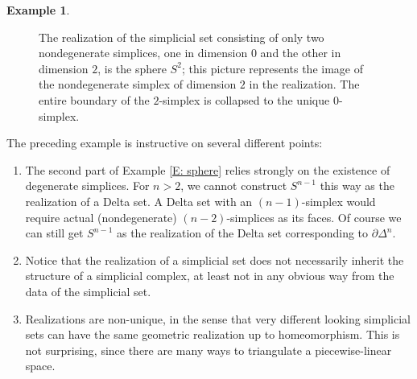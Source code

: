 \documentclass[12pt]{article}
\theoremstyle{plain}
\theoremstyle{definition}
\newtheorem{example}[theorem]{Example}
\newcommand{\bd}{\partial}
\begin{document}
\begin{example}
\begin{figure}[!htp]
\begin{center}
\end{center}
\caption{The realization of the simplicial set consisting of only two nondegenerate simplices, one in dimension $0$ and the other in dimension $2$, is the sphere $S^2$; this picture represents the image of the nondegenerate simplex of dimension $2$ in the realization. The entire boundary of the $2$-simplex is collapsed to the unique $0$-simplex. }\label{F: fig16}
\end{figure}


\end{example}

The preceding example is instructive on several different points:

\begin{enumerate}
\item The second part of Example \ref{E: sphere} relies strongly on the existence of degenerate simplices. For $n>2$, we cannot construct $S^{n-1}$ this way as the realization of a Delta set. A Delta set with an $(n-1)$-simplex would require actual (nondegenerate) $(n-2)$-simplices as its faces. Of course we can still get $S^{n-1}$ as the realization of the Delta set corresponding to $\bd \Delta^n$.  

\item Notice that the realization of a simplicial set does not necessarily inherit the structure of a simplicial complex, at least not in any obvious way from the data of the simplicial set. 

\item Realizations are non-unique, in the sense that very different looking simplicial sets can have the same geometric realization up to homeomorphism. This is not surprising, since there are many ways to triangulate a piecewise-linear space.

\end{enumerate}
\end{document}
